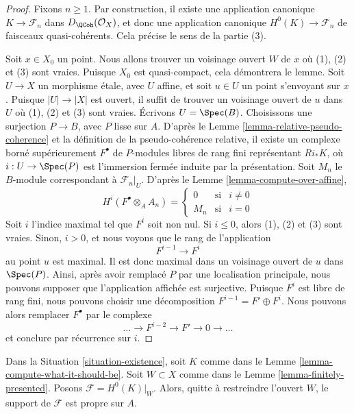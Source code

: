 \begin{proof}
Fixons $n \geq 1$. Par construction, il existe une application canonique
$K \to \mathcal{F}_n$ dans $D_\QCoh(\mathcal{O}_X)$,
et donc une application canonique $H^0(K) \to \mathcal{F}_n$
de faisceaux quasi-cohérents. Cela précise le sens de la partie (3).

\medskip\noindent
Soit $x \in X_0$ un point. Nous allons trouver un voisinage ouvert $W$
de $x$ où (1), (2) et (3) sont vraies. Puisque $X_0$ est quasi-compact,
cela démontrera le lemme. Soit $U \to X$ un morphisme \'etale,
avec $U$ affine, et soit $u \in U$ un point s'envoyant sur $x$. Puisque $|U| \to |X|$
est ouvert, il suffit de trouver un voisinage ouvert de $u$ dans $U$
où (1), (2) et (3) sont vraies. Écrivons $U = \Spec(B)$.
Choisissons une surjection $P \to B$, avec $P$ lisse sur $A$.
D'après le Lemme \ref{lemma-relative-pseudo-coherence}
et la définition de la pseudo-cohérence relative,
il existe un complexe borné supérieurement $F^\bullet$
de $P$-modules libres de rang fini représentant
$Ri_*K$, où $i : U \to \Spec(P)$ est l'immersion
fermée induite par la présentation.
Soit $M_n$ le $B$-module correspondant à $\mathcal{F}_n|_U$.
D'après le Lemme \ref{lemma-compute-over-affine},
$$
H^i(F^\bullet \otimes_A A_n) =
\left\{
\begin{matrix}
0 & \text{si} & i \not = 0 \\
M_n & \text{si} & i = 0
\end{matrix}
\right.
$$
Soit $i$ l'indice maximal tel que $F^i$ soit non nul.
Si $i \leq 0$, alors (1), (2) et (3) sont vraies.
Sinon, $i > 0$, et nous voyons que le rang de l'application
$$
F^{i - 1} \to F^i
$$
au point $u$ est maximal. Il est donc maximal dans un voisinage ouvert
de $u$ dans $\Spec(P)$. Ainsi, après avoir remplacé
$P$ par une localisation principale, nous pouvons supposer que l'application affichée
est surjective. Puisque $F^i$ est libre de rang fini, nous pouvons choisir
une décomposition $F^{i - 1} = F' \oplus F^i$. Nous pouvons alors
remplacer $F^\bullet$ par le complexe
$$
\ldots \to F^{i - 2} \to F' \to 0 \to \ldots
$$
et conclure par récurrence sur $i$.
\end{proof}

\begin{lemma}
\label{lemma-proper-support}
Dans la Situation \ref{situation-existence}, soit $K$ comme dans le
Lemme \ref{lemma-compute-what-it-should-be}. Soit $W \subset X$
comme dans le Lemme \ref{lemma-finitely-presented}.
Posons $\mathcal{F} = H^0(K)|_W$. Alors, quitte à restreindre l'ouvert $W$,
le support de $\mathcal{F}$ est propre sur $A$.
\end{lemma}


